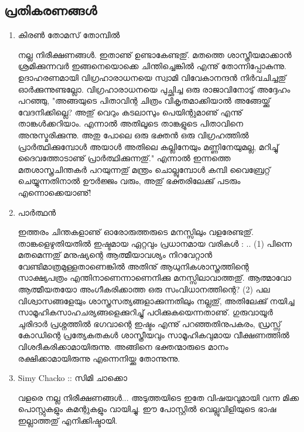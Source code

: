 \subsection*{പ്രതികരണങ്ങള്‍}
\begin{enumerate}
 \item{കിരണ്‍ തോമസ് തോമ്പില്‍}

നല്ല നിരീക്ഷണങ്ങള്‍. ഇതാണു് ഉണ്ടാകേണ്ടതു്. മതത്തെ ശാസ്ത്രീയമാക്കാന്‍ ശ്രമിക്കുന്നവര്‍ ഇങ്ങനെയൊക്കെ ചിന്തിച്ചെങ്കില്‍ 
എന്നു് തോന്നിപ്പോകുന്നു. ഉദാഹരണമായി വിഗ്രഹാരാധനയെ സ്വാമി വിവേകാനന്ദന്‍ നിര്‍വചിച്ചതു് ഓര്‍ക്കുന്നുണ്ടല്ലോ. 
വിഗ്രഹാരാധനയെ പുച്ഛിച്ച ഒരു രാജാവിനോടു് അദ്ദേഹം പറഞ്ഞു, "അങ്ങയുടെ പിതാവിന്റ ചിത്രം വികൃതമാക്കിയാല്‍ 
അങ്ങേയ്ക്കു് വേദനിക്കില്ലെ? അതു് വെറും കടലാസും പെയിന്റുമാണു് എന്നു് താങ്കള്‍ക്കറിയാം. എന്നാല്‍ അതിലൂടെ താങ്കളുടെ 
പിതാവിനെ അനുസ്മരിക്കുന്നു. അതു പോലെ ഒരു ഭക്തന്‍ ഒരു വിഗ്രഹത്തില്‍ പ്രാര്‍ത്ഥിക്കുമ്പോള്‍ അയാള്‍ അതിലെ 
കല്ലിനേയും മണ്ണിനേയുമല്ല, മറിച്ചു് ദൈവത്തോടാണു് പ്രാര്‍ത്ഥിക്കുന്നതു്." എന്നാല്‍ ഇന്നത്തെ മതശാസ്ത്രചിന്തകര്‍ പറയുന്നതു് 
മന്ത്രം ചൊല്ലുമ്പോള്‍ കമ്പി വൈബ്രേറ്റ്‌ ചെയ്യുന്നതിനാല്‍ ഊര്‍ജ്ജം വരും, അതു് ഭക്തരിലേക്കു് പടരും എന്നൊക്കെയാണു്!

 \item{പാര്‍ത്ഥന്‍}

ഇത്തരം ചിന്തകളാണു് ഓരോരുത്തരുടെ മനസ്സിലും വളരേണ്ടതു്. താങ്കളെഴുതിയതില്‍ ഇഷ്ടമായ ഏറ്റവും പ്രധാനമായ വരികള്‍ : .. (1) പിന്നെ മതമെന്നതു് മനുഷ്യന്റെ ആത്മീയാവശ്യം നിറവേറ്റാന്‍ വേണ്ടിമാത്രമുള്ളതാണെങ്കില്‍ അതിനു് ആധുനികശാസ്ത്രത്തിന്റെ സാക്ഷ്യപത്രം എന്തിനാണെന്നാണെനിക്കു മനസ്സിലാവാത്തതു്. ആത്മാവോ ആത്മീയതയോ അംഗീകരിക്കാത്ത ഒരു സംവിധാനത്തിന്റെ? (2) പല വിശ്വാസങ്ങളേയും ശാസ്ത്രസത്യങ്ങളാക്കുന്നതിലും നല്ലതു്, അതിലേക്കു് നയിച്ച സാമൂഹികസാഹചര്യങ്ങളെക്കുറിച്ചു് പഠിക്കുകയെന്നതാണു്. ഗുരുവായൂര്‍ ചുരിദാര്‍ പ്രശ്നത്തില്‍ ഭഗവാന്റെ ഇഷ്ടം എന്നു് പറഞ്ഞതിനുപകരം, ഡ്രസ്സ്‌ കോഡിന്റെ പ്രത്യേകതകള്‍ ശാസ്ത്രീയവും സാമൂഹികവുമായ വീക്ഷണത്തില്‍ വിശദീകരിക്കാമായിരുന്നു. അങ്ങിനെ ഭക്തന്മാരുടെ മാനം രക്ഷിക്കാമായിരുന്നു എന്നെനിയ്ക്കു തോന്നുന്നു.
 
  \item{Simy Chacko :: സിമി ചാക്കൊ}

വളരെ നല്ല നിരീക്ഷണങ്ങള്‍... അടുത്തയിടെ ഇതേ വിഷയവുമായി വന്ന മിക്ക പൊസ്റ്റുകളും കമന്റുകളും വായിച്ചു. 
ഈ പോസ്റ്റില്‍ വെല്ലുവിളിയുടെ ഭാഷ ഇല്ലാത്തതു് എനിക്കിഷ്ടായി.
    
\end{enumerate}

\newpage
